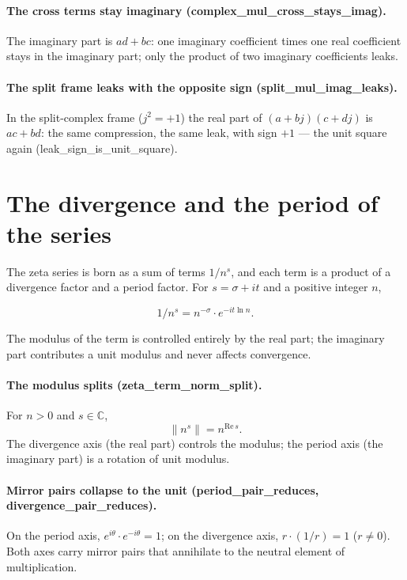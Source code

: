 \documentclass[sigplan,10pt,anonymous,review]{acmart}
\begin{document}
\paragraph{The cross terms stay imaginary
(complex\_mul\_cross\_stays\_imag).} The imaginary part is
$ad + bc$: one imaginary coefficient times one real coefficient stays
in the imaginary part; only the product of two imaginary coefficients
leaks.

\paragraph{The split frame leaks with the opposite sign
(split\_mul\_imag\_leaks).} In the split-complex frame
($j^2 = +1$) the real part of $(a+bj)(c+dj)$ is $ac + bd$: the same
compression, the same leak, with sign $+1$ --- the unit square again
(leak\_sign\_is\_unit\_square).

\section{The divergence and the period of the series}

The zeta series is born as a sum of terms $1/n^s$, and each term is a
product of a divergence factor and a period factor. For $s = \sigma +
it$ and a positive integer $n$,

\begin{equation*}
  1/n^s = n^{-\sigma} \cdot e^{-it \ln n}.
\end{equation*}

The modulus of the term is controlled entirely by the real part; the
imaginary part contributes a unit modulus and never affects
convergence.

\paragraph{The modulus splits (zeta\_term\_norm\_split).}
For $n > 0$ and $s \in \mathbb{C}$,
\begin{equation*}
  \|n^s\| = n^{\mathrm{Re}\,s}.
\end{equation*}
The divergence axis (the real part) controls the modulus; the period
axis (the imaginary part) is a rotation of unit modulus.

\paragraph{Mirror pairs collapse to the unit
(period\_pair\_reduces, divergence\_pair\_reduces).}
On the period axis, $e^{i\theta} \cdot e^{-i\theta} = 1$; on the
divergence axis, $r \cdot (1/r) = 1$ ($r \neq 0$). Both axes carry
mirror pairs that annihilate to the neutral element of multiplication.
\end{document}
